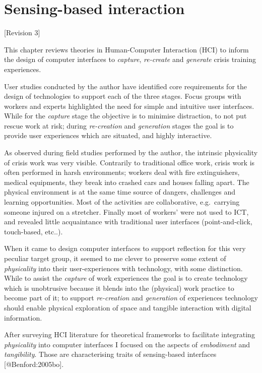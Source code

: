 \section{Sensing-based interaction}\label{interaction}

{[}Revision 3{]}

This chapter reviews theories in Human-Computer Interaction (HCI) to
inform the design of computer interfaces to \emph{capture},
\emph{re-create} and \emph{generate} crisis training experiences.

User studies conducted by the author have identified core requirements
for the design of technologies to support each of the three stages.
Focus groups with workers and experts highlighted the need for simple
and intuitive user interfaces. While for the \emph{capture} stage the
objective is to minimise distraction, to not put rescue work at risk;
during \emph{re-creation} and \emph{generation} stages the goal is to
provide user experiences which are situated, and highly interactive.

As observed during field studies performed by the author, the intrinsic
physicality of crisis work was very visible. Contrarily to traditional
office work, crisis work is often performed in harsh environments;
workers deal with fire extinguishers, medical equipments, they break
into crashed cars and houses falling apart. The physical environment is
at the same time source of dangers, challenges and learning
opportunities. Most of the activities are collaborative, e.g.~carrying
someone injured on a stretcher. Finally most of workers' were not used
to ICT, and revealed little acquaintance with traditional user
interfaces (point-and-click, touch-based, etc..).

When it came to design computer interfaces to support reflection for
this very peculiar target group, it seemed to me clever to preserve some
extent of \emph{physicality} into their user-experiences with
technology, with some distinction. While to assist the \emph{capture} of
work experiences the goal is to create technology which is unobtrusive
because it blends into the (physical) work practice to become part of
it; to support \emph{re-creation} and \emph{generation} of experiences
technology should enable physical exploration of space and tangible
interaction with digital information.

After surveying HCI literature for theoretical frameworks to facilitate
integrating \emph{physicality} into computer interfaces I focused on the
aspects of \emph{embodiment} and \emph{tangibility}. Those are
characterising traits of sensing-based interfaces {[}@Benford:2005bo{]}.

